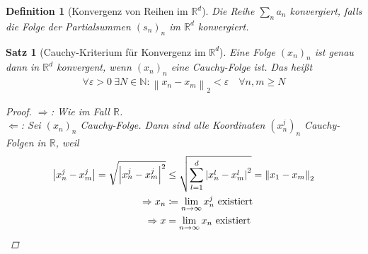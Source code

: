 \documentclass[11pt, twoside, a4paper]{article}
\theoremstyle{plain}
\newtheorem{definition}[blockelement]{Definition}
\newtheorem{satz}[blockelement]{Satz}
\newcommand{\abs}[1]{\left\lvert#1\right\rvert}
\newcommand{\norm}[1]{\left\lVert#1\right\rVert}
\newcommand{\impl}[0]{\Rightarrow{}}
\newcommand{\fromto}{\rightarrow{}}
\newcommand{\definedas}[0]{\coloneqq}
\newcommand{\ntoinf}[0]{n\fromto\infty}
\newcommand{\anf}[1]{\glqq{}#1\grqq}
\newcommand{\R}{\mathbb{R}}
\newcommand{\N}{\mathbb{N}}
\begin{document}
    \begin{definition}[Konvergenz von Reihen im $\R^d$]
        Die Reihe $\sum_{n} a_n$ konvergiert, falls die Folge der Partialsummen $(s_n)_n$ im $\R^d$ konvergiert.
    \end{definition}

    \begin{satz}[Cauchy-Kriterium für Konvergenz im $\R^d$]
        \label{satz:cauchy-Rd}
        Eine Folge $(x_n)_n$ ist genau dann in $\R^d$ konvergent, wenn $(x_n)_n$ eine Cauchy-Folge ist. Das heißt
        \begin{align*}
            \forall\varepsilon > 0~\exists N\in\N\colon \norm{x_n-x_m}_2 < \varepsilon\quad\forall n,m\geq N
        \end{align*}

        \begin{proof}
            \anf{$\impl$}: Wie im Fall $\R$.\\
            \anf{$\Leftarrow$}: Sei $(x_n)_n$ Cauchy-Folge. Dann sind alle Koordinaten $(x_n^j)_n$ Cauchy-Folgen in $\R$, weil
            \begin{align*}
                \abs{x_n^j-x_m^j} = \sqrt {\abs{x_n^j-x_m^j}^2} &\leq \sqrt {\sum_{l=1}^{d} \abs{x_n^l - x_m^l}^2} = \norm{x_1-x_m}_2\\
                \impl x_n &\definedas \lim_{\ntoinf} x_n^j\text{ existiert}\\
                \impl x &= \lim_{\ntoinf} x_n\text{ existiert}\qedhere
            \end{align*}
        \end{proof}
    \end{satz}
\end{document}
